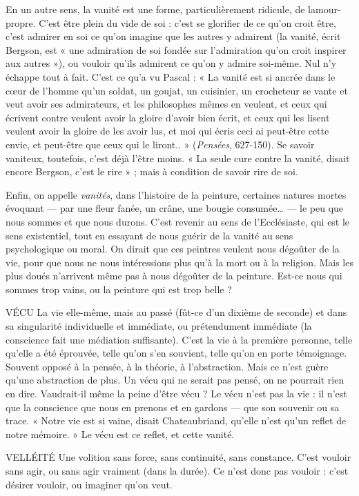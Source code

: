 En un autre sens, la vanité est une forme, particulièrement ridicule, de
lamour-propre. C’est être plein du vide de soi : c’est se glorifier de ce qu’on
croit être, c’est admirer en soi ce qu’on imagine que les autres y admirent (la
vanité, écrit Bergson, est « une admiration de soi fondée sur l’admiration qu’on
croit inspirer aux autres »), ou vouloir qu’ils admirent ce qu’on y admire soi-même.
Nul n’y échappe tout à fait. C’est ce qu’a vu Pascal : « La vanité est si
ancrée dans le cœur de l’homme qu’un soldat, un goujat, un cuisinier, un crocheteur
se vante et veut avoir ses admirateurs, et les philosophes mêmes en veulent,
et ceux qui écrivent contre veulent avoir la gloire d’avoir bien écrit, et ceux
qui les lisent veulent avoir la gloire de les avoir lus, et moi qui écris ceci ai peut-être
cette envie, et peut-être que ceux qui le liront.. » ({\it Pensées}, 627-150). Se
savoir vaniteux, toutefois, c’est déjà l’être moins. « La seule cure contre la
vanité, disait encore Bergson, c’est le rire » ; mais à condition de savoir rire de
soi.

Enfin, on appelle {\it vanités}, dans l’histoire de la peinture, certaines natures
mortes évoquant — par une fleur fanée, un crâne, une bougie consumée… — le
peu que nous sommes et que nous durons. C’est revenir au sens de l’Ecclésiaste,
qui est le sens existentiel, tout en essayant de nous guérir de la vanité au sens
psychologique ou moral. On dirait que ces peintres veulent nous dégoûter de
la vie, pour que nous ne nous intéressions plus qu’à la mort ou à la religion.
Mais les plus doués n’arrivent même pas à nous dégoûter de la peinture. Est-ce
nous qui sommes trop vains, ou la peinture qui est trop belle ?

VÉCU La vie elle-même, mais au passé (fût-ce d’un dixième de seconde) et
dans sa singularité individuelle et immédiate, ou prétendument
immédiate (la conscience fait une médiation suffisante). C’est la vie à la première
personne, telle qu’elle a été éprouvée, telle qu’on s’en souvient, telle
qu’on en porte témoignage. Souvent opposé à la pensée, à la théorie, à l’abstraction.
Mais ce n’est guère qu’une abstraction de plus. Un vécu qui ne serait
pas pensé, on ne pourrait rien en dire. Vaudrait-il même la peine d’être vécu ?
Le vécu n’est pas la vie : il n’est que la conscience que nous en prenons et
en gardons — que son souvenir ou sa trace. « Notre vie est si vaine, disait Chateaubriand,
qu’elle n’est qu’un reflet de notre mémoire. » Le vécu est ce reflet,
et cette vanité.

VELLÉITÉ Une volition sans force, sans continuité, sans constance. C’est
vouloir sans agir, ou sans agir vraiment (dans la durée). Ce n’est
donc pas vouloir : c’est désirer vouloir, ou imaginer qu’on veut.


